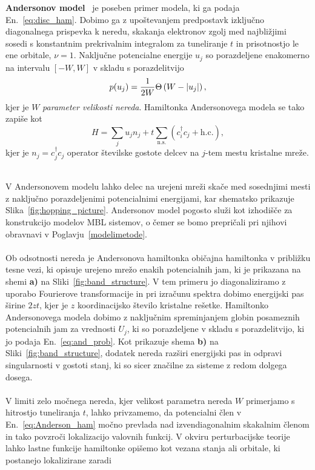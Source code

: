 \textbf{Andersonov model}~\cite{anderson1958absence} je poseben primer modela, ki ga podaja En.~\eqref{eq:disc_ham}. Dobimo ga z upoštevanjem predpostavk izključno diagonalnega prispevka k neredu, skakanja elektronov zgolj med najbližjimi sosedi s konstantnim prekrivalnim integralom za tuneliranje $t$ in prisotnostjo le ene orbitale, $\nu=1$. Naključne potencialne energije $u_j$ so porazdeljene enakomerno na intervalu $\left[-W,W\right]$ v skladu s porazdelitvijo
\begin{equation}\label{eq:and_prob}
p(u_j)= \frac{1}{2W}\Theta \left(W - \left| u_j \right| \right),
\end{equation}
kjer je $W$ \emph{parameter velikosti nereda}. Hamiltonka Andersonovega modela se tako zapiše kot 
\begin{equation}\label{eq:Anderson_ham}
H=\sum\limits_j u_j n_j + t\sum\limits_{\mathrm{n. s.}}\left(c^\dagger_i c_j + \mathrm{h.c.}\right),
\end{equation}
kjer je $n_j=c^\dagger_jc_j$ operator številske gostote delcev na $j$-tem mestu kristalne mreže.\\\\
\begin{minipage}[t]{0.55\textwidth}
V Andersonovem modelu lahko delec na urejeni mreži skače med sosednjimi mesti z naključno porazdeljenimi potencialnimi energijami, kar shematsko prikazuje Slika~\ref{fig:hopping_picture}. Andersonov model pogosto služi kot izhodišče za konstrukcijo modelov MBL sistemov, o čemer se bomo prepričali pri njihovi obravnavi v Poglavju~\ref{modelimetode}.\\\\
Ob odsotnosti nereda je Andersonova hamiltonka običajna hamiltonka v približku tesne vezi, ki opisuje urejeno mrežo enakih potencialnih jam, ki je prikazana na shemi \textbf{a)} na Sliki~\ref{fig:band_structure}.  V tem primeru jo diagonaliziramo z uporabo Fourierove transformacije in pri izračunu spektra dobimo energijski pas širine $2zt$, kjer je $z$ koordinacijsko število kristalne rešetke. Hamiltonko Andersonovega modela dobimo z naključnim spreminjanjem globin posameznih potencialnih jam za vrednosti $U_j$, ki so porazdeljene v skladu s porazdelitvijo, ki jo podaja En.~\eqref{eq:and_prob}. Kot prikazuje shema \textbf{b)} na Sliki~\ref{fig:band_structure}, dodatek nereda razširi energijski pas in odpravi singularnosti v gostoti stanj, ki so sicer značilne za sisteme z redom dolgega dosega. \\\\
V limiti zelo močnega nereda, kjer velikost parametra nereda $W$ primerjamo s hitrostjo tuneliranja $t$, lahko privzamemo, da potencialni člen v En.~\eqref{eq:Anderson_ham} močno prevlada nad izvendiagonalnim skakalnim členom in tako povzroči lokalizacijo valovnih funkcij. V okviru perturbacijske teorije lahko lastne funkcije hamiltonke opišemo kot vezana stanja ali orbitale, ki postanejo lokalizirane zaradi 
\end{minipage}\hfill

